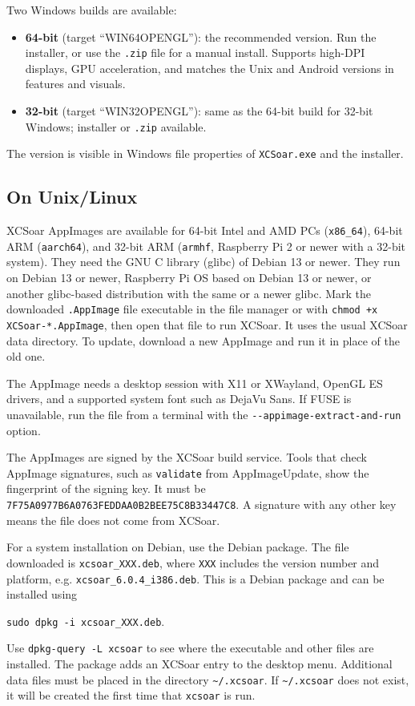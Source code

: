Two Windows builds are available:
\begin{itemize}
\item \textbf{64-bit} (target ``WIN64OPENGL''): the recommended
  version. Run the installer, or use the \verb|.zip| file for a manual
  install. Supports high-DPI displays, GPU acceleration, and matches the
  Unix and Android versions in features and visuals.
\item \textbf{32-bit} (target ``WIN32OPENGL''): same as the 64-bit
  build for 32-bit Windows; installer or \verb|.zip| available.
\end{itemize}

The version is visible in Windows file properties of
\texttt{XCSoar.exe} and the installer.

\subsection*{On Unix/Linux}

XCSoar AppImages are available for 64-bit Intel and AMD PCs
(\texttt{x86\_64}), 64-bit ARM (\texttt{aarch64}), and 32-bit ARM
(\texttt{armhf}, Raspberry Pi 2 or newer with a 32-bit system). They
need the GNU C library (glibc) of Debian 13 or newer. They run on
Debian 13 or newer, Raspberry Pi OS based on Debian 13 or newer, or
another glibc-based distribution with the same or a newer glibc.
Mark the downloaded \texttt{.AppImage} file executable in the file manager or
with \verb|chmod +x XCSoar-*.AppImage|, then open that file to run XCSoar.
It uses the usual XCSoar data directory. To update, download a new
AppImage and run it in place of the old one.

The AppImage needs a desktop session with X11 or XWayland,
OpenGL ES drivers, and a supported system font such
as DejaVu Sans. If FUSE is unavailable, run the file from a terminal
with the \verb|--appimage-extract-and-run| option.

The AppImages are signed by the XCSoar build service. Tools that check
AppImage signatures, such as \verb|validate| from AppImageUpdate, show
the fingerprint of the signing key. It must be
\verb|7F75A0977B6A0763FEDDAA0B2BEE75C8B33447C8|. A signature with any
other key means the file does not come from XCSoar.

For a system installation on Debian, use the Debian package.
The file downloaded is \verb|xcsoar_XXX.deb|, where \verb|XXX| includes
the version number and platform, e.g. \verb|xcsoar_6.0.4_i386.deb|.
This is a Debian package and can be installed using
\begin{center}
\verb|sudo dpkg -i xcsoar_XXX.deb|.
\end{center}
Use \verb|dpkg-query -L xcsoar| to see where the executable and
other files are installed.
The package adds an XCSoar entry to the desktop menu.
Additional data files must be placed in the directory
\verb|~/.xcsoar|.
If \verb|~/.xcsoar| does not exist, it will be created the first time
that \verb|xcsoar| is run.

